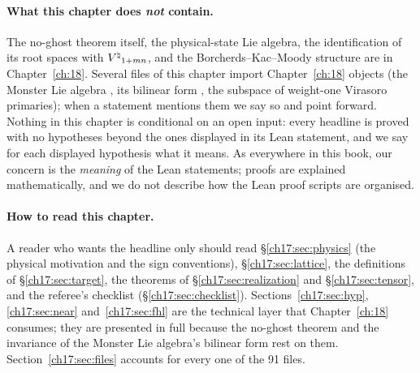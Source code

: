 \paragraph{What this chapter does \emph{not} contain.}  The no-ghost theorem itself, the physical-state
Lie algebra, the identification of its root spaces with ${V^{\natural}}_{1+mn}$, and the Borcherds--Kac--Moody
structure are in Chapter~\ref{ch:18}.  Several files of this chapter import Chapter~\ref{ch:18} objects
(the Monster Lie algebra , its bilinear form , the
subspace  of weight-one Virasoro primaries); when a statement mentions them we say
so and point forward.  Nothing in this chapter is conditional on an open input: every headline is proved
with no hypotheses beyond the ones displayed in its Lean statement, and we say for each displayed
hypothesis what it means.  As everywhere in this book, our concern is the \emph{meaning} of the Lean
statements; proofs are explained mathematically, and we do not describe how the Lean proof scripts are
organised.

\paragraph{How to read this chapter.}  A reader who wants the headline only should read
\S\ref{ch17:sec:physics} (the physical motivation and the sign conventions), \S\ref{ch17:sec:lattice},
the definitions of \S\ref{ch17:sec:target}, the theorems of \S\ref{ch17:sec:realization} and
\S\ref{ch17:sec:tensor}, and the referee's checklist (\S\ref{ch17:sec:checklist}).
Sections~\ref{ch17:sec:hyp}, \ref{ch17:sec:near} and~\ref{ch17:sec:fhl} are the technical layer that
Chapter~\ref{ch:18} consumes; they are presented in full because the no-ghost theorem and the invariance
of the Monster Lie algebra's bilinear form rest on them.  Section~\ref{ch17:sec:files} accounts for every
one of the 91 files.

